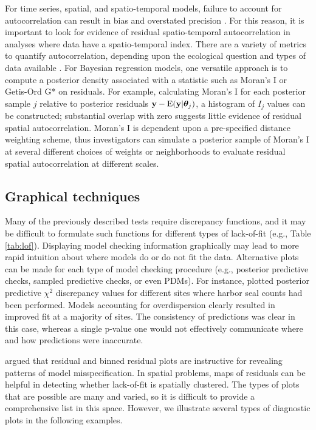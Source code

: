 \documentclass[12pt,english]{article}
\begin{document}
\begin{spacing}{1.9}
For time series, spatial, and spatio-temporal models, failure to
account for autocorrelation can result in bias and overstated
precision \citep{LichsteinEtAl2002}.  For this reason, it is important
to look for evidence of residual spatio-temporal autocorrelation in
analyses where data have a spatio-temporal index.  There are a variety
of metrics to quantify autocorrelation, depending upon the ecological
question and types of data available \cite[e.g.,][]{PerryEtAl2002}.
For Bayesian regression models, one versatile approach is to compute a
posterior density associated with a statistic such as Moran's I
\citep{Moran1950} or Getis-Ord G* \citep{GetisOrd1992} on residuals.
For example, calculating Moran's I for each posterior sample $j$
relative to posterior residuals
${\bf y} - \textrm{E}({\bf y} | \boldsymbol{\theta}_j)$, a histogram
of $I_j$ values can be constructed; substantial overlap with zero
suggests little evidence of residual spatial autocorrelation.  Moran's I is dependent upon a pre-specified distance
weighting scheme, thus investigators can simulate a posterior sample of
Moran's I at several different choices of weights or neighborhoods to
evaluate residual spatial autocorrelation at different scales.

\subsection{Graphical techniques}

Many of the previously described tests require discrepancy functions,
and it may be difficult to formulate such functions for different
types of lack-of-fit (e.g., Table \ref{tab:lof}).  Displaying model checking information graphically
may lead to more rapid intuition about where models do or do not fit
the data.  Alternative plots can be made for each type of model
checking procedure (e.g., posterior predictive checks, sampled
predictive checks, or even PDMs).  For instance, \citet{VerHoefFrost2003} plotted
posterior predictive $\chi^2$ discrepancy values for different sites where harbor
seal counts had been performed.  Models accounting for overdispersion clearly resulted
in improved fit at a majority of sites.  The consistency of predictions was clear in this case, whereas
a single p-value one would not effectively communicate where and how predictions were inaccurate.

\citet{GelmanEtAl2014} argued that residual and binned residual plots
are instructive for revealing patterns of model misspecification.
In spatial problems, maps of residuals can be helpful in detecting
whether lack-of-fit is spatially clustered.  The types of plots that
are possible are many and varied, so it is difficult to provide a
comprehensive list in this space. However, we illustrate several types
of diagnostic plots in the following examples.


\end{spacing}
\end{document}
